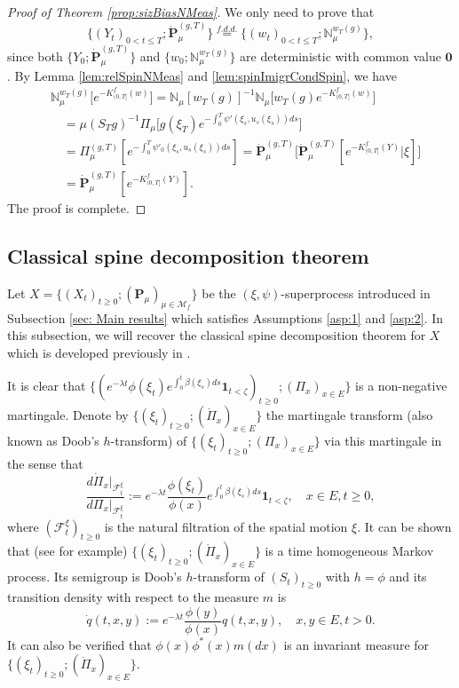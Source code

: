 \documentclass[UTF8]{pkuthss}
\theoremstyle{plain}
\theoremstyle{definition}
\numberwithin{equation}{section}
\begin{document}
\begin{proof}[Proof of Theorem \ref{prop:sizBiasNMeas}]
    We only need to prove that
\[
	\{(Y_t)_{0<t\le T}; \dot{\mathbf P}^{(g,T)}_\mu\}
	\overset{f.d.d.}{=} \{(w_t)_{0<t\le T}; \mathbb N_\mu^{w_T(g)}\},
\]
	since both $\{Y_0; \dot{\mathbf P}^{(g,T)}_\mu\}$ and $\{w_0; \mathbb N_\mu^{w_T(g)}\}$ are deterministic with common value $\mathbf 0$.
	By Lemma \ref{lem:relSpinNMeas} and \ref{lem:spinImigrCondSpin}, we have
\begin{align}
    &\mathbb N_\mu^{w_T(g)}\big[e^{-K_{(0, T]}^f(w)}\big]
	=\mathbb N_\mu[w_T(g)]^{-1} \mathbb N_\mu \big[w_T(g) e^{-K_{(0, T]}^f(w)}\big]\\
	&\quad =\mu(S_Tg)^{-1}  \Pi_\mu\big[g(\xi_T) e^{-\int_0^T \psi'(\xi_s,u_s(\xi_s)) ds}\big]\\
	&\quad =\Pi^{(g,T)}_{\mu}[e^{-\int_0^T \psi'_0(\xi_s, u_s(\xi_s)) ds}]
	=\dot {\mathbf P}^{(g,T)}_\mu\big[ \dot{\mathbf P}^{(g,T)}_\mu[e^{-K_{(0, T]}^f(Y)}|\xi] \big]\\
	&\quad = \dot{\mathbf P}^{(g,T)}_\mu[e^{-K_{(0, T]}^f(Y)}].
\end{align}
	The proof is complete.
\end{proof}

\subsection{Classical spine decomposition theorem}
\label{sec: classcal spine decomposition}
	Let $X=\{(X_t)_{t\geq 0}; (\mathbf P_\mu)_{\mu \in \mathcal M_f}\}$ be the $(\xi,\psi)$-superprocess introduced in Subsection \ref{sec: Main results} which satisfies Assumptions \ref{asp:1} and \ref{asp:2}.
	In this subsection, we will recover the classical spine decomposition theorem for $X$ which is developed previously in \cite{EckhoffKyprianouWinkel2015Spines, EnglanderKyprianou2004Local, LiuRenSong2009LlogL}.

	It is clear that $\{(e^{-\lambda t}\phi(\xi_t) e^{\int_0^t \beta(\xi_s) ds}\mathbf 1_{t< \zeta})_{t \geq 0}; (\Pi_x)_{x\in E}\}$ is a non-negative martingale.
	Denote by $\{(\xi_t)_{t\geq 0}; (\dot{\Pi}_x)_{x\in E}\}$ the martingale transform (also known as Doob's $h$-transform) of $\{(\xi_t)_{t\geq 0}; (\Pi_x)_{x\in E}\}$ via this martingale in the sense that
\[
	\frac {d \dot{\Pi}_x|_{\mathscr F_t^\xi}} {d \Pi_x|_{\mathscr F_t^\xi}}
	:=e^{-\lambda t} \frac {\phi(\xi_t)} {\phi(x)} e^{\int_0^t \beta(\xi_s) ds} \mathbf 1_{t< \zeta},
	\quad x \in E,t \geq 0,
\]
	where $(\mathscr F^\xi_t)_{t\geq 0}$ is the natural filtration of the spatial motion $\xi$.
   It can be shown that
	(see \cite{KimSong2008Intrinsic} for example) $\{(\xi_t)_{t\geq 0}; (\dot{\Pi}_x)_{x\in E}\}$ is a time homogeneous Markov 
	process.
 Its semigroup is Doob's  $h$-transform of $(S_t)_{t\geq 0}$ with $h=\phi$ and its transition density with respect to the measure $m$ is
\[
	\dot{q}(t,x,y)
	:= e^{-\lambda t}\frac {\phi(y)} {\phi(x)} q(t,x,y),
	\quad x, y\in E, t> 0.
\]
	It can also be verified that $\phi(x)\phi^*(x)m(dx)$ is an invariant measure for $\{(\xi_t)_{t\geq 0}; (\dot{\Pi}_x)_{x\in E}\}$.
\end{document}
